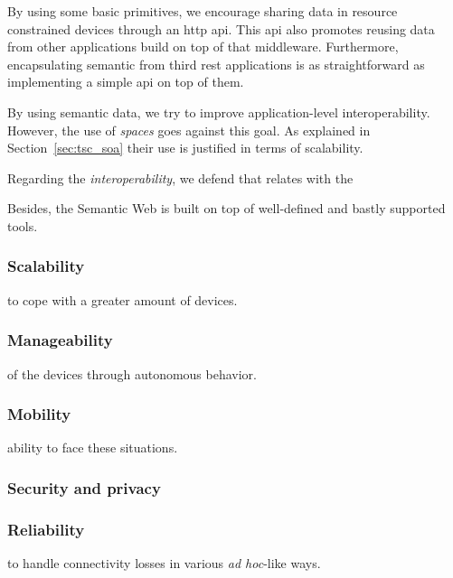 By using some basic primitives, we encourage sharing data in resource constrained devices through an \ac{http} \ac{api}.
This \ac{api} also promotes reusing data from other applications build on top of that middleware.
Furthermore, encapsulating semantic from third \ac{rest} applications is as straightforward as implementing a simple \ac{api} on top of them.

By using semantic data, we try to improve application-level interoperability.
However, the use of \emph{spaces} goes against this goal.
As explained in Section~\ref{sec:tsc_soa} their use is justified in terms of scalability.


Regarding the \emph{interoperability}, we defend that relates with the 

Besides, the Semantic Web is built on top of well-defined and bastly supported tools.



\subsubsection{Scalability}
to cope with a greater amount of devices.


\subsubsection{Manageability}
of the devices through autonomous behavior. %

\subsubsection{Mobility}
ability to face these situations.

\subsubsection{Security and privacy}

\subsubsection{Reliability}
to handle connectivity losses in various \emph{ad hoc}-like ways.



